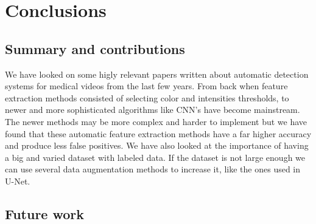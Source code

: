 \documentclass[thesis.tex]{subfiles}
\begin{document}
\chapter{Conclusions} \label{conclusions}

\section{Summary and contributions}
We have looked on some higly relevant papers written about automatic detection systems for medical videos from the last few years. From back when feature extraction methods consisted of selecting color and intensities thresholds, to newer and more sophisticated algorithms like CNN's have become mainstream. The newer methods may be more complex and harder to implement but we have found that these automatic feature extraction methods have a far higher accuracy and produce less false positives. We have also looked at the importance of having a big and varied dataset with labeled data. If the dataset is not large enough we can use several data augmentation methods to increase it, like the ones used in U-Net. 

\section{Future work} %
\end{document}
